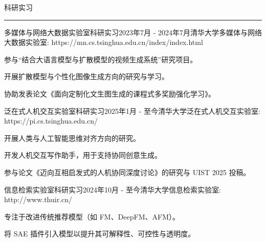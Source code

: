 \documentclass{resume} %
\renewenvironment{rSection}[1]{
\sectionskip
\textcolor{TsinghuaPurple}{\MakeUppercase{#1}}
\sectionlineskip
\hrule
\begin{list}{}{
\setlength{\leftmargin}{0em}
}
\item[]
}{
\end{list}
}
\begin{document}

\begin{rSection}{科研实习}

\begin{rSubsection}{多媒体与网络大数据实验室科研实习}{2023年7月 - 2024年7月}{清华大学多媒体与网络大数据实验室: https://mn.cs.tsinghua.edu.cn/index/index.html}{}              
\item 参与“结合大语言模型与扩散模型的视频生成系统”研究项目。  
\item 开展扩散模型与个性化图像生成方向的研究与学习。
\item 协助发表论文《面向定制化文生图生成的课程式多奖励强化学习》。
\end{rSubsection}  

\begin{rSubsection}{泛在式人机交互实验室科研实习}{2025年1月 - 至今}{清华大学泛在式人机交互实验室: https://pi.cs.tsinghua.edu.cn/}{}              
\item 开展人类与人工智能思维对齐方向的研究。
\item 开发人机交互写作助手，用于支持协同创意生成。
\item 参与论文《迈向互相启发式的人机协同深度讨论》的研究与 UIST 2025 投稿。
\end{rSubsection}  

\begin{rSubsection}{信息检索实验室科研实习}{2024年10月 - 至今}{清华大学信息检索实验室: http://www.thuir.cn/}{}              
\item 专注于改进传统推荐模型（如 FM、DeepFM、AFM）。
\item 将 SAE 插件引入模型以提升其可解释性、可控性与透明度。
\end{rSubsection}  

\end{rSection}

\end{document}
